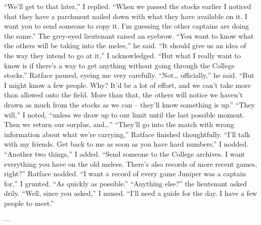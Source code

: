 \documentclass[12pt, openany]{book}
\begin{document}
“We’ll get to that later,” I replied. “When we passed the stocks earlier I noticed that they have a parchment nailed down with what they have available on it. I want you to send someone to copy it. I’m guessing the other captains are doing the same.”
The grey-eyed lieutenant raised an eyebrow.
“You want to know what the others will be taking into the melee,” he said.
“It should give us an idea of the way they intend to go at it,” I acknowledged. “But what I really want to know is if there’s a way to get anything without going through the College stocks.”
Ratface paused, eyeing me very carefully.
“Not… officially,” he said. “But I might know a few people. Why? It’d be a lot of effort, and we can’t take more than allowed onto the field. More than that, the others will notice we haven’t drawn as much from the stocks as we can – they’ll know something is up.”
“They will,” I noted, “unless we draw up to our limit until the last possible moment. Then we return our surplus, and…”
“They’ll go into the match with wrong information about what we’re carrying,” Ratface finished thoughtfully. “I’ll talk with my friends. Get back to me as soon as you have hard numbers.”
I nodded.
“Another two things,” I added. “Send someone to the College archives. I want everything you have on the old melees. There’s also records of more recent games, right?”
Ratface nodded.
“I want a record of every game Juniper was a captain for,” I grunted. “As quickly as possible.”
“Anything else?” the lieutenant asked drily.
“Well, since you asked,” I mused. “I’ll need a guide for the day. I have a few people to meet.”

—
\end{document}
